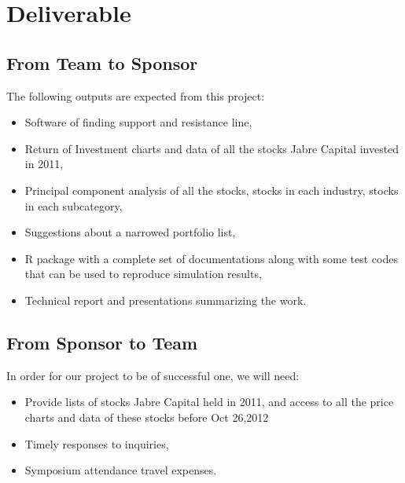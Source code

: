 \documentclass[12pt,letterpaper]{article}
\theoremstyle{definition}
\begin{document}
\section{Deliverable}
\subsection{From Team to Sponsor} %
The following outputs are expected from this project:
\begin{itemize}
    \item Software of finding support and resistance line,
    \item Return of Investment charts and data of all the stocks Jabre Capital invested in 2011,
    \item Principal component analysis of all the stocks, stocks in each industry, stocks in each subcategory,
    \item Suggestions about a narrowed portfolio list,
    \item R package with a complete set of documentations along with some test codes that can be used to reproduce simulation results,
    \item Technical report and presentations summarizing the work. 
\end{itemize}

\subsection{From Sponsor to Team} %

In order for our project to be of successful one, we will need:
\begin{itemize}
    \item Provide lists of stocks Jabre Capital held in 2011, and access to all the price charts and data of these stocks before Oct 26,2012
     \item Timely responses to inquiries, 
    \item Symposium attendance travel expenses.
\end{itemize}


%
%
\end{document}

